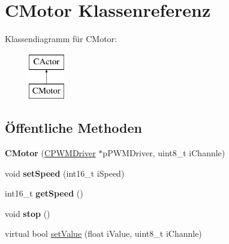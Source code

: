 \hypertarget{class_c_motor}{\section{\-C\-Motor \-Klassenreferenz}
\label{class_c_motor}
}
\-Klassendiagramm für \-C\-Motor\-:\begin{figure}[H]
\begin{center}
\leavevmode
\includegraphics[height=2.000000cm]{class_c_motor}
\end{center}
\end{figure}
\subsection*{Öffentliche \-Methoden}
\begin{DoxyCompactItemize}
\item 
\hypertarget{class_c_motor_a5f57ccb412c2fed1ab8737635bc792d7}{{\bfseries \-C\-Motor} (\hyperlink{class_c_p_w_m_driver}{\-C\-P\-W\-M\-Driver} $\ast$p\-P\-W\-M\-Driver, uint8\-\_\-t i\-Channle)}\label{class_c_motor_a5f57ccb412c2fed1ab8737635bc792d7}

\item 
\hypertarget{class_c_motor_ae25560c278459aae37e4299e0b4dfca0}{void {\bfseries set\-Speed} (int16\-\_\-t i\-Speed)}\label{class_c_motor_ae25560c278459aae37e4299e0b4dfca0}

\item 
\hypertarget{class_c_motor_ae34038ec0b69bc46462e706ca9fa9454}{int16\-\_\-t {\bfseries get\-Speed} ()}\label{class_c_motor_ae34038ec0b69bc46462e706ca9fa9454}

\item 
\hypertarget{class_c_motor_acaf02cf61cb003e1d675c696a1411df1}{void {\bfseries stop} ()}\label{class_c_motor_acaf02cf61cb003e1d675c696a1411df1}

\item 
virtual bool \hyperlink{class_c_motor_a83fa60cbf910c7386fb45db8ea875de1}{set\-Value} (float i\-Value, uint8\-\_\-t i\-Channle)
\end{DoxyCompactItemize}


